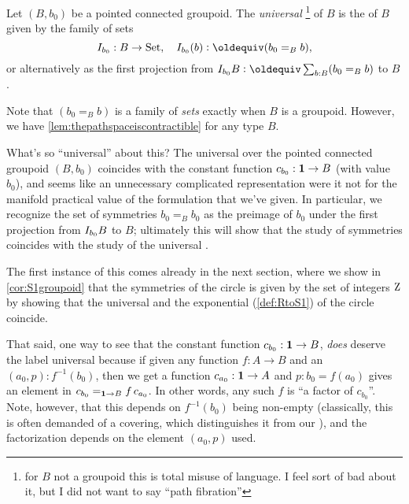 \begin{definition}
  \label{def:universalcover}
  Let $(B,b_0)$ be a pointed connected groupoid.  
The \emph{universal \covering}\footnote{for $B$ not a groupoid this is total misuse of language.  I feel sort of bad about it, but I did not want to say ``path fibration''} of $B$ is the \covering of $B$ given by the family of sets 
  $$\uc{b_0}:B\to\Set,\quad \uc{b_0}(b)\defequi (b_0=_Bb),$$
or alternatively as the first projection from $\uc{b_0}B\defequi\sum_{b:B}(b_0=_Bb)$ to $B$. 
\end{definition}
Note that $(b_0=_B b)$ is a family of \emph{sets} exactly when $B$ is a groupoid. 
However, we have \cref{lem:thepathspaceiscontractible} for any type $B$.

\begin{remark}
  What's so ``universal'' about this?
The universal \covering over the pointed connected groupoid $(B,b_0)$ coincides with the constant function $c_{b_0}:\mathbf{1}\to B$ (with value $b_0$), and seems like an unnecessary complicated representation were it not for the manifold practical value of the formulation that we've given.  
In particular, we recognize the set of symmetries $b_0=_Bb_0$ as the preimage of $b_0$ under the first projection from ${I_{b_0}}B$ to $B$; ultimately this will show that the study of symmetries coincides with the study of the universal \covering.

The first instance of this comes already in the next section, where we show in \cref{cor:S1groupoid} that the symmetries of the circle is given by the set of integers $\mathrm{Z}$ by showing that the universal \covering and the exponential \covering (\cref{def:RtoS1}) of the circle coincide.

That said, one way to see that the constant function $c_{b_0}:\mathbf{1}\to B$, \emph{does} deserve the label universal because if given any function $f:A\to B$ and an $(a_0,p): f^{-1}(b_0)$, then we get a function $c_{a_0}:\mathbf{1}\to A$ and $p:b_0=f(a_0)$ gives an element in $c_{b_0}=_{\mathbf{1}\to B}f\, c_{a_0}$.  In other words, any such $f$ is ``a factor of $c_{b_0}$''.  
Note, however, that this depends on $f^{-1}(b_0)$ being non-empty (classically, this is often demanded of a covering, which distinguishes it from our \coverings), and the factorization depends on the element $(a_0,p)$ used. 
\end{remark}



